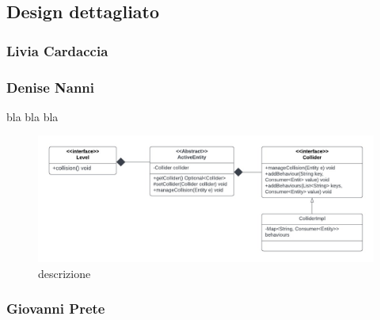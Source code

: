 \documentclass{article}
\begin{document}
\subsection{Design dettagliato}
\subsubsection{Livia Cardaccia}

\subsubsection{Denise Nanni}
bla bla bla
\begin{figure}[ht]
    \includegraphics[width=1\textwidth]{umlCollider.jpg}
    \caption{descrizione}
    \label{fig:schgen}
\end{figure}
\subsubsection{Giovanni Prete}
\end{document}
